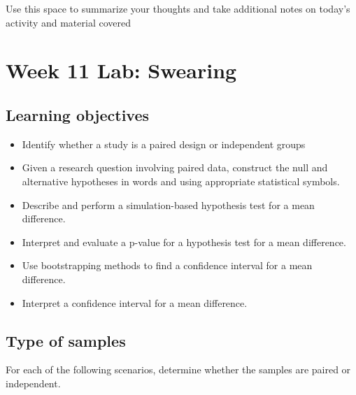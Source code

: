 \documentclass[
]{report}
\begin{document}
Use this space to summarize your thoughts and take additional notes on today's activity and material covered

\newpage

\hypertarget{week-11-lab-swearing}{%
\section{Week 11 Lab: Swearing}\label{week-11-lab-swearing}}


\hypertarget{learning-objectives-16}{%
\subsection{Learning objectives}\label{learning-objectives-16}}

\begin{itemize}
\item
  Identify whether a study is a paired design or independent groups
\item
  Given a research question involving paired data, construct the null and alternative hypotheses
  in words and using appropriate statistical symbols.
\item
  Describe and perform a simulation-based hypothesis test for a mean difference.
\item
  Interpret and evaluate a p-value for a hypothesis test for a mean difference.
\item
  Use bootstrapping methods to find a confidence interval for a mean difference.
\item
  Interpret a confidence interval for a mean difference.
\end{itemize}

\hypertarget{type-of-samples}{%
\subsection{Type of samples}\label{type-of-samples}}

For each of the following scenarios, determine whether the samples are paired or independent.
\end{document}
